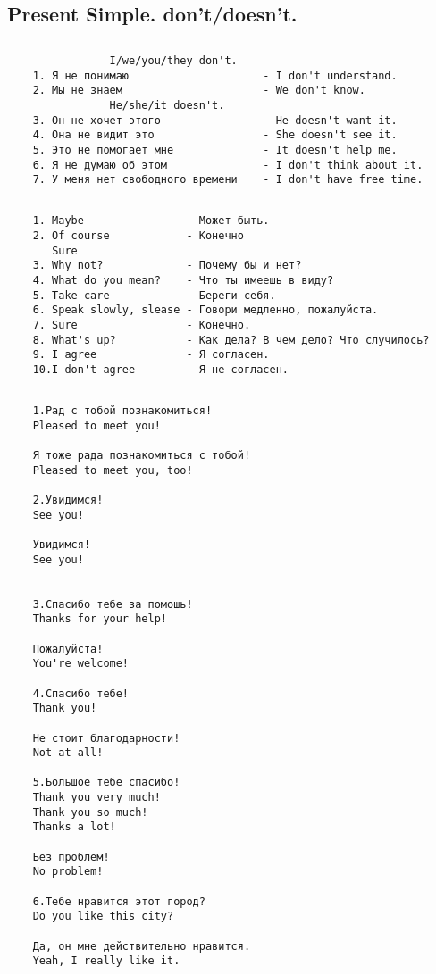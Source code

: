 \subsection{Present Simple. don't/doesn't.}
\subsection*{}
\begin{verbatim}
                I/we/you/they don't.
    1. Я не понимаю                     - I don't understand.
    2. Мы не знаем                      - We don't know.
                He/she/it doesn't.
    3. Он не хочет этого                - He doesn't want it.
    4. Она не видит это                 - She doesn't see it.
    5. Это не помогает мне              - It doesn't help me.
    6. Я не думаю об этом               - I don't think about it.
    7. У меня нет свободного времени    - I don't have free time.
\end{verbatim}

\subsection*{}
\begin{verbatim}
    1. Maybe                - Может быть.
    2. Of course            - Конечно
       Sure
    3. Why not?             - Почему бы и нет?
    4. What do you mean?    - Что ты имеешь в виду?
    5. Take care            - Береги себя.
    6. Speak slowly, slease - Говори медленно, пожалуйста.
    7. Sure                 - Конечно.
    8. What's up?           - Как дела? В чем дело? Что случилось?
    9. I agree              - Я согласен.
    10.I don't agree        - Я не согласен.
\end{verbatim}

\subsection*{}
\begin{verbatim}
    1.Рад с тобой познакомиться!
    Pleased to meet you!

    Я тоже рада познакомиться с тобой!
    Pleased to meet you, too!

    2.Увидимся!
    See you!

    Увидимся!
    See you!


    3.Спасибо тебе за помошь!
    Thanks for your help!

    Пожалуйста!
    You're welcome!

    4.Спасибо тебе!
    Thank you!

    Не стоит благодарности!
    Not at all!

    5.Большое тебе спасибо!
    Thank you very much!
    Thank you so much!
    Thanks a lot!

    Без проблем!
    No problem!

    6.Тебе нравится этот город?
    Do you like this city?

    Да, он мне действительно нравится.
    Yeah, I really like it.
\end{verbatim}

